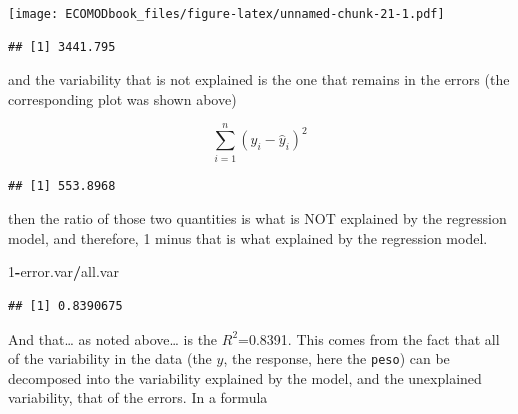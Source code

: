 \documentclass[
]{book}
\newenvironment{Shaded}{\begin{snugshade}}{\end{snugshade}}
\newcommand{\DecValTok}[1]{\textcolor[rgb]{0.00,0.00,0.81}{#1}}
\newcommand{\KeywordTok}[1]{\textcolor[rgb]{0.13,0.29,0.53}{\textbf{#1}}}
\newcommand{\NormalTok}[1]{#1}
\newcommand{\OperatorTok}[1]{\textcolor[rgb]{0.81,0.36,0.00}{\textbf{#1}}}
\begin{document}
\texttt{[image: ECOMODbook\_files/figure-latex/unnamed-chunk-21-1.pdf]}

\begin{Shaded}
\end{Shaded}

\begin{verbatim}
## [1] 3441.795
\end{verbatim}

and the variability that is not explained is the one that remains in the errors (the corresponding plot was shown above)

\[\sum_{i=1}^n (y_i- \hat y_i)^2\]

\begin{Shaded}
\end{Shaded}

\begin{verbatim}
## [1] 553.8968
\end{verbatim}

then the ratio of those two quantities is what is NOT explained by the regression model, and therefore, 1 minus that is what explained by the regression model.

\begin{Shaded}
\begin{Highlighting}[]
\DecValTok{1}\OperatorTok{-}\NormalTok{error.var}\OperatorTok{/}\NormalTok{all.var}
\end{Highlighting}
\end{Shaded}

\begin{verbatim}
## [1] 0.8390675
\end{verbatim}

And that\ldots{} as noted above\ldots{} is the \(R^2\)=0.8391. This comes from the fact that all of the variability in the data (the \(y\), the response, here the \texttt{peso}) can be decomposed into the variability explained by the model, and the unexplained variability, that of the errors. In a formula
\end{document}
